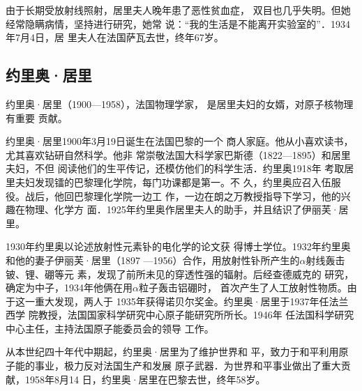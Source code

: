 由于长期受放射线照射，居里夫人晚年患了恶性贫血症，
双目也几乎失明。但她经常隐瞒病情，坚持进行研究，她常
说：“我的生活是不能离开实验室的”．1934年7月4日，居
里夫人在法国萨瓦去世，终年67岁。

\subsection{约里奥·居里}
约里奥·居里（1900—1958），法国物理学家，
是居里夫妇的女婿，对原子核物理有重要
贡献。

约里奥·居里1900年3月19日诞生在法国巴黎的一个
商人家庭。他从小喜欢读书，尤其喜欢钻研自然科学。他非
常崇敬法国大科学家巴斯德（1822—1895）和居里夫妇，不但
阅读他们的生平传记，还模仿他们的科学生活．约里奥1918年
考取居里夫妇发现镭的巴黎理化学院，每门功课都是第一。不
久，约里奥应召入伍服役。战后，他回巴黎理化学院一边工
作，一边在朗之万教授指导下学习，他的兴趣在物理、化学方
面．1925年约里奥作居里夫人的助手，并且结识了伊丽芙·居里。

1930年约里奥以论述放射性元素钋的电化学的论文获
得博士学位。1932年约里奥和他的妻子伊丽芙·居里（1897
—1956）合作，用放射性钋所产生的$\alpha$射线轰击铍、锂、硼等元
素，发现了前所未见的穿透性强的辐射。后经查德威克的
研究，确定为中子，1934年他俩在用$\alpha$粒子轰击铝硼时，
首次产生了人工放射性物质。由于这一重大发现，两人于
1935年获得诺贝尔奖金。约里奥·居里于1937年任法兰西学
院教授，法国国家科学研究中心原子能研究所所长。1946年
任法国科学研究中心主任，主持法国原子能委员会的领导
工作。

从本世纪四十年代中期起，约里奥·居里为了维护世界和
平，致力于和平利用原子能的事业，极力反对法国生产和发展
原子武器．为世界和平事业做出了重大贡献，1958年8月14
日，约里奥·居里在巴黎去世，终年58岁。

































































